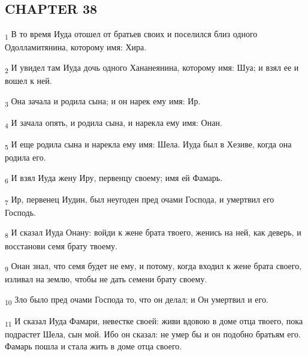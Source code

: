 \subsection{CHAPTER 38}
\begin{tcolorbox}
\textsubscript{1} В то время Иуда отошел от братьев своих и поселился близ одного Одолламитянина, которому имя: Хира.
\end{tcolorbox}
\begin{tcolorbox}
\textsubscript{2} И увидел там Иуда дочь одного Хананеянина, которому имя: Шуа; и взял ее и вошел к ней.
\end{tcolorbox}
\begin{tcolorbox}
\textsubscript{3} Она зачала и родила сына; и он нарек ему имя: Ир.
\end{tcolorbox}
\begin{tcolorbox}
\textsubscript{4} И зачала опять, и родила сына, и нарекла ему имя: Онан.
\end{tcolorbox}
\begin{tcolorbox}
\textsubscript{5} И еще родила сына и нарекла ему имя: Шела. Иуда был в Хезиве, когда она родила его.
\end{tcolorbox}
\begin{tcolorbox}
\textsubscript{6} И взял Иуда жену Иру, первенцу своему; имя ей Фамарь.
\end{tcolorbox}
\begin{tcolorbox}
\textsubscript{7} Ир, первенец Иудин, был неугоден пред очами Господа, и умертвил его Господь.
\end{tcolorbox}
\begin{tcolorbox}
\textsubscript{8} И сказал Иуда Онану: войди к жене брата твоего, женись на ней, как деверь, и восстанови семя брату твоему.
\end{tcolorbox}
\begin{tcolorbox}
\textsubscript{9} Онан знал, что семя будет не ему, и потому, когда входил к жене брата своего, изливал на землю, чтобы не дать семени брату своему.
\end{tcolorbox}
\begin{tcolorbox}
\textsubscript{10} Зло было пред очами Господа то, что он делал; и Он умертвил и его.
\end{tcolorbox}
\begin{tcolorbox}
\textsubscript{11} И сказал Иуда Фамари, невестке своей: живи вдовою в доме отца твоего, пока подрастет Шела, сын мой. Ибо он сказал: не умер бы и он подобно братьям его. Фамарь пошла и стала жить в доме отца своего.
\end{tcolorbox}
